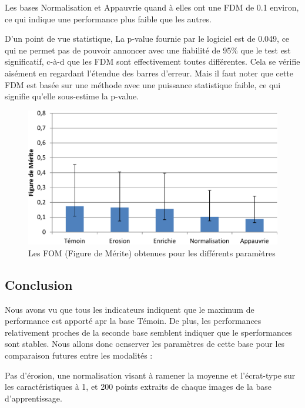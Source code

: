 Les bases Normalisation et Appauvrie quand à elles ont une FDM de 0.1 environ, ce qui indique une performance plus faible que les autres.

D'un point de vue statistique, La p-value fournie par le logiciel est de 0.049, ce qui ne permet pas de pouvoir annoncer avec une fiabilité de 95\% que le test est significatif, c-à-d que les FDM sont effectivement toutes différentes. Cela se vérifie aisément en regardant l'étendue des barres d'erreur. Mais il faut noter que cette FDM est basée sur une méthode avec une puissance statistique faible, ce qui signifie qu'elle sous-estime la p-value.

\begin{figure}[h!]
 \begin{center}
   \includegraphics[width=15cm]{images/FOM_param}
 \end{center}
 \caption{Les FOM (Figure de Mérite) obtenues pour les différents paramètres}
 \label{lab:fom_param}
\end{figure}

\subsection{Conclusion}

Nous avons vu que tous les indicateurs indiquent que le maximum de performance est apporté apr la base Témoin. De plus, les  performances relativement proches de la seconde base semblent indiquer que le sperformances sont stables. Nous allons donc ocnserver les paramètres de cette base pour les comparaison futures entre les modalités :

Pas d'érosion, une normalisation visant à ramener la moyenne et l'écrat-type sur les caractéristiques à 1, et 200 points extraits de chaque images de la base d'apprentissage.
 

\FloatBarrier

